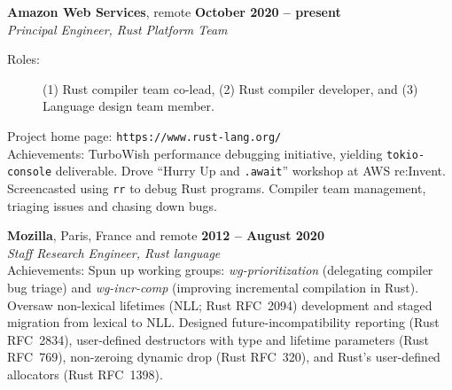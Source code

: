 \documentclass[margin,line,draft]{res}
\begin{document}
\begin{resume}
    \textbf{Amazon Web Services}, remote \hfill \textbf{October 2020 -- present}\\\vspace{1mm}%
    \textsl{Principal Engineer, Rust Platform Team}
\begin{description}
\item[\rm Roles:]
  (1) Rust compiler team co-lead, (2) Rust compiler developer, and (3) Language design team member.
\end{description}
    \vspace{-2mm}
    Project home page: {\tt https://www.rust-lang.org/} \\
    Achievements: TurboWish performance debugging initiative, yielding \texttt{tokio-console} deliverable. Drove ``Hurry Up and \texttt{.await}'' workshop
    at AWS re:Invent. Screencasted using \texttt{rr} to debug Rust programs. Compiler team management, triaging issues and chasing down bugs.

    \textbf{Mozilla}, Paris, France and remote \hfill \textbf{2012 -- August 2020}\\\vspace{1mm}%
    \textsl{Staff Research Engineer, Rust language} \\
    Achievements: Spun up working groups: \emph{wg-prioritization} (delegating compiler bug triage) and \emph{wg-incr-comp} (improving incremental compilation in Rust). Oversaw non-lexical lifetimes (NLL; Rust RFC~2094) development and staged migration from lexical to NLL. Designed future-incompatibility reporting (Rust RFC~2834), user-defined destructors with type and lifetime parameters (Rust RFC~769), non-zeroing dynamic drop (Rust RFC~320),  and Rust's user-defined allocators (Rust RFC~1398).


\end{resume}
\end{document}
